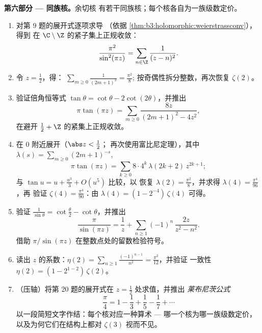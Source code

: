 \begin{problem}
\medskip
\noindent\textbf{第六部分 --- 同族核。}余切核
有若干同族核；每个核各自为一族级数定价。
\begin{enumerate}[resume]
  \item 对第 9 题的展开式逐项求导
        （依据
        \cref{thm:b3:holomorphic:weierstrassconv}），得到
        在 $\C\setminus\Z$ 的紧子集上正规收敛：
        \[
        \frac{\pi^2}{\sin^2(\pi z)} =
        \sum_{n\in\Z}\frac1{(z - n)^2} .
        \]
  \item 令 $z = \frac12$，得：
        $\sum_{m\geq0}\frac1{(2m+1)^2} = \frac{\pi^2}8$;
        按奇偶性拆分整数，再次恢复
        $\zeta(2)$。
  \item 验证倍角恒等式 $\tan\theta =
        \cot\theta - 2\cot(2\theta)$，并推出
        \[
        \pi\tan(\pi z) =
        \sum_{m\geq0}\frac{8z}{(2m+1)^2 - 4z^2} ,
        \]
        在避开 $\frac12 + \Z$ 的紧集上正规收敛。
  \item 在 $0$ 附近展开（$\abs z < \frac12$；
        再次使用富比尼定理），其中 $\lambda(s) =
        \sum_{m\geq0}(2m+1)^{-s}$,
        \[
        \pi\tan(\pi z) =
        \sum_{k\geq0}8\cdot4^k\,\lambda(2k+2)\,z^{2k+1} ;
        \]
        与 $\tan u = u + \frac{u^3}3 + O(u^5)$ 比较，以
        恢复 $\lambda(2) = \frac{\pi^2}8$，并求得
        $\lambda(4) = \frac{\pi^4}{96}$，再
        验证 $\zeta(4) = \frac{\pi^4}{90}$：由 $\lambda(4) = (1 -
        2^{-4})\,\zeta(4)$ 可得。
  \item 验证 $\frac1{\sin\theta} = \cot\frac\theta2 -
        \cot\theta$，并推出
        \[
        \frac{\pi}{\sin(\pi z)} = \frac1z +
        \sum_{n\geq1}(-1)^n\,\frac{2z}{z^2 - n^2} .
        \]
        借助
        $\pi/\sin(\pi z)$ 在整数点处的留数检验符号。
  \item 读出 $z$ 的系数：$\eta(2) =
        \sum_{n\geq1}\frac{(-1)^{n-1}}{n^2} =
        \frac{\pi^2}{12}$，并验证
        一致性 $\eta(2) = (1 - 2^{1-2})\,\zeta(2)$。
  \item （压轴）将第 20 题的展开式在 $z =
        \frac12$ 处求值，并推出 \emph{莱布尼茨公式}
        \[
        \frac\pi4 = 1 - \frac13 + \frac15 - \frac17 +
        \cdots
        \]
        以一段简短文字作结：每个核对应一种算术
        --- 哪一个核为哪一族级数定价，
        以及为何它们在结构上都对
        $\zeta(3)$ 视而不见。


\end{enumerate}
\end{problem}
